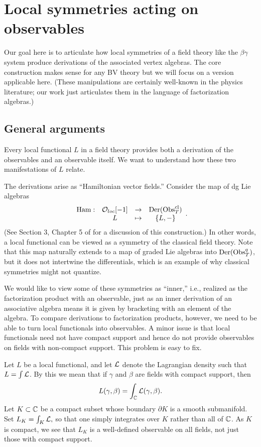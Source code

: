 \section{Local symmetries acting on observables}
\label{sec loc sym}

Our goal here is to articulate how local symmetries of a field theory like the $\beta\gamma$ system
produce derivations of the associated vertex algebras. 
The core construction makes sense for any BV theory 
but we will focus on a version applicable here.
(These manipulations are certainly well-known in the physics literature; 
our work just articulates them in the language of factorization algebras.)

\subsection{General arguments}

Every local functional $L$ in a field theory provides both a derivation of the observables 
and an observable itself.
We want to understand how these two manifestations of $L$ relate.

The derivations arise as ``Hamiltonian vector fields.''
Consider the map of dg Lie algebras
\[
\begin{array}{cccc}
{\rm Ham}: & \mathcal O_{loc}[-1] & \to & {\rm Der}({\rm Obs}_T^{\rm cl}) \\
& L & \mapsto & \{L,-\} 
\end{array}.
\]
(See Section 3, Chapter 5 of \cite{CosBook} for a discussion of this construction.)
In other words, a local functional can be viewed as a symmetry of the classical field theory.
Note that this map naturally extends to a map of graded Lie algebras into ${\rm Der}({\rm Obs}_T^q)$,
but it does not intertwine the differentials,
which is an example of why classical symmetries might not quantize.

We would like to view some of these symmetries as ``inner,''
i.e., realized as the factorization product with an observable,
just as an inner derivation of an associative algebra means it is given by bracketing with an element of the algebra.
To compare derivations to factorization products, however, 
we need to be able to turn local functionals into observables.
A minor issue is that local functionals need not have compact support
and hence do not provide observables on fields with non-compact support.
This problem is easy to fix.

Let $L$ be a local functional,
and let $\mathcal L$ denote the Lagrangian density such that $L = \int \mathcal L$.
By this we mean that if $\gamma$ and $\beta$ are fields with compact support, 
then
\[
L(\gamma,\beta) = \int_\mathbb C \mathcal L(\gamma,\beta).
\]
Let $K \subset \mathbb C$ be a compact subset whose boundary $\partial K$ is a smooth submanifold.
Set $L_K = \int_K \mathcal L,$ so that one simply integrates over $K$ rather than all of $\mathbb C$.
As $K$ is compact, we see that $L_K$ is a well-defined observable on all fields, not just those with compact support.

